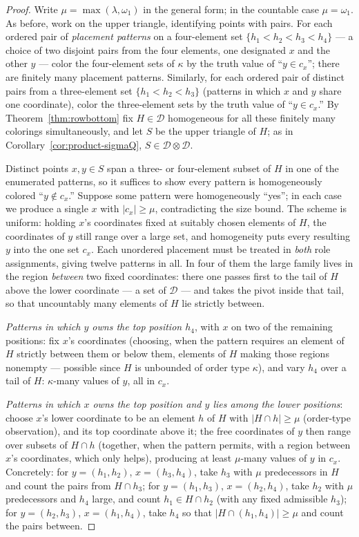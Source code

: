 \documentclass[11pt]{article}
\theoremstyle{definition}
\newcommand{\D}{\mathcal{D}}
\begin{document}
\begin{proof}
Write $\mu=\max(\lambda,\omega_1)$ in the general form; in the countable
case $\mu=\omega_1$. As before, work on the upper triangle, identifying
points with pairs. For each ordered pair of \emph{placement patterns} on a
four-element set $\{h_1<h_2<h_3<h_4\}$ --- a choice of two disjoint pairs
from the four elements, one designated $x$ and the other $y$ --- color the
four-element sets of $\kappa$ by the truth value of ``$y\in c_x$''; there
are finitely many placement patterns. Similarly, for each ordered pair of
distinct pairs from a three-element set $\{h_1<h_2<h_3\}$ (patterns in
which $x$ and $y$ share one coordinate), color the three-element sets by
the truth value of ``$y\in c_x$.'' By Theorem~\ref{thm:rowbottom} fix
$H\in\D$ homogeneous for all these finitely many colorings
simultaneously, and let $S$ be the upper triangle of $H$; as in
Corollary~\ref{cor:product-sigmaQ}, $S\in\D\otimes\D$.

Distinct points $x,y\in S$ span a three- or four-element subset of $H$ in
one of the enumerated patterns, so it suffices to show every pattern is
homogeneously colored ``$y\notin c_x$.'' Suppose some pattern were
homogeneously ``yes''; in each case we produce a single $x$ with
$|c_x|\ge\mu$, contradicting the size bound. The scheme is uniform:
holding $x$'s coordinates fixed at suitably chosen elements of $H$, the
coordinates of $y$ still range over a large set, and homogeneity puts
every resulting $y$ into the one set $c_x$. Each unordered placement must be treated in \emph{both} role assignments,
giving twelve patterns in all. In four of them the large family lives in the
region \emph{between} two fixed coordinates: there one passes first to the
tail of $H$ above the lower coordinate --- a set of $\D$ --- and takes the
pivot inside that tail, so that uncountably many elements of $H$ lie
strictly between.

\emph{Patterns in which $y$ owns the top position $h_4$}, with $x$ on two
of the remaining positions: fix $x$'s coordinates (choosing, when the
pattern requires an element of $H$ strictly between them or below them,
elements of $H$ making those regions nonempty --- possible since $H$ is
unbounded of order type $\kappa$), and vary $h_4$ over a tail of $H$:
$\kappa$-many values of $y$, all in $c_x$.

\emph{Patterns in which $x$ owns the top position and $y$ lies among the
lower positions}: choose $x$'s lower coordinate to be an element $h$ of
$H$ with $|H\cap h|\ge\mu$ (order-type observation), and its top
coordinate above it; the free coordinates of $y$ then range over subsets
of $H\cap h$ (together, when the pattern permits, with a region between
$x$'s coordinates, which only helps), producing at least $\mu$-many values
of $y$ in $c_x$. Concretely: for $y=(h_1,h_2)$, $x=(h_3,h_4)$, take
$h_3$ with $\mu$ predecessors in $H$ and count the pairs from
$H\cap h_3$; for $y=(h_1,h_3)$, $x=(h_2,h_4)$, take $h_2$ with $\mu$
predecessors and $h_4$ large, and count $h_1\in H\cap h_2$ (with any fixed
admissible $h_3$); for $y=(h_2,h_3)$, $x=(h_1,h_4)$, take $h_4$ so that
$|H\cap(h_1,h_4)|\ge\mu$ and count the pairs between.


\end{proof}
\end{document}
